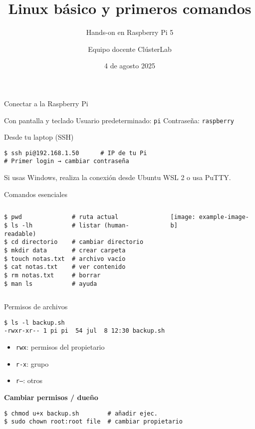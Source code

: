 \documentclass[aspectratio=169, professionalfonts]{beamer}
\title[ClústerLab • Día 1]{Linux básico y primeros comandos}
\subtitle{Hands-on en Raspberry Pi 5}
\author{Equipo docente ClústerLab}
\date{4 de agosto 2025}
\begin{document}
\begin{frame}[plain]
  \titlepage
\end{frame}

\begin{frame}[fragile]{Conectar a la Raspberry Pi}
\begin{block}{Con pantalla y teclado}
  Usuario predeterminado: \texttt{pi} \hfill Contraseña: \texttt{raspberry}
\end{block}
\pause
\begin{block}{Desde tu laptop (SSH)}
\begin{lstlisting}[style=shell]
$ ssh pi@192.168.1.50      # IP de tu Pi
# Primer login → cambiar contraseña
\end{lstlisting}
\end{block}
\pause
\small Si usas Windows, realiza la conexión desde Ubuntu WSL 2 o usa PuTTY.
\end{frame}

\begin{frame}[fragile]{Comandos esenciales}
\begin{columns}[T]
\begin{column}{0.55\textwidth}
\begin{lstlisting}[style=shell]
$ pwd              # ruta actual
$ ls -lh           # listar (human-readable)
$ cd directorio    # cambiar directorio
$ mkdir data       # crear carpeta
$ touch notas.txt  # archivo vacío
$ cat notas.txt    # ver contenido
$ rm notas.txt     # borrar
$ man ls           # ayuda
\end{lstlisting}
\end{column}
\begin{column}{0.4\textwidth}
\texttt{[image: example-image-b]}
\end{column}
\end{columns}
\end{frame}

\begin{frame}[fragile]{Permisos de archivos}
\begin{lstlisting}[style=shell]
$ ls -l backup.sh
-rwxr-xr-- 1 pi pi  54 jul  8 12:30 backup.sh
\end{lstlisting}
\begin{itemize}
  \item \texttt{rwx}: permisos del propietario
  \item \texttt{r-x}: grupo
  \item \texttt{r--}: otros
\end{itemize}
\pause
\textbf{Cambiar permisos / dueño}
\begin{lstlisting}[style=shell]
$ chmod u+x backup.sh        # añadir ejec.
$ sudo chown root:root file  # cambiar propietario
\end{lstlisting}
\end{frame}
\end{document}
